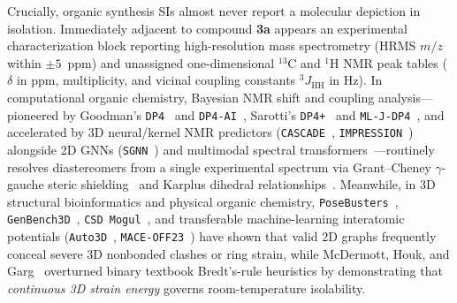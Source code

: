 \documentclass[10pt,twocolumn]{article}
\begin{document}
Crucially, organic synthesis SIs almost never report a molecular depiction in isolation. Immediately adjacent to compound \textbf{3a} appears an experimental characterization block reporting high-resolution mass spectrometry (HRMS $m/z$ within $\pm 5$~ppm) and unassigned one-dimensional $^{13}\text{C}$ and $^{1}\text{H}$ NMR peak tables ($\delta$ in ppm, multiplicity, and vicinal coupling constants $^3J_{\text{HH}}$ in Hz). In computational organic chemistry, Bayesian NMR shift and coupling analysis---pioneered by Goodman's \texttt{DP4}~\cite{Smith2010DP4} and \texttt{DP4-AI}~\cite{Howarth2020DP4AI}, Sarotti's \texttt{DP4+}~\cite{Grimblat2015DP4Plus} and \texttt{ML-J-DP4}~\cite{Tsai2022MLJDP4}, and accelerated by 3D neural/kernel NMR predictors (\texttt{CASCADE}~\cite{Guan2021CASCADE}, \texttt{IMPRESSION}~\cite{Gerrard2020IMPRESSION}) alongside 2D GNNs (\texttt{SGNN}~\cite{Jonas2019SGNN}) and multimodal spectral transformers~\cite{Kim2023DeepSAT,Alberts2024MultimodalSpectra,Bushuiev2024MassSpecGym,Bohde2025DiffMS}---routinely resolves diastereomers from a single experimental spectrum via Grant--Cheney $\gamma$-gauche steric shielding~\cite{GrantCheney1967} and Karplus dihedral relationships~\cite{Karplus1963}. Meanwhile, in 3D structural bioinformatics and physical organic chemistry, \texttt{PoseBusters}~\cite{Buttenschoen2024PoseBusters}, \texttt{GenBench3D}~\cite{Baillif2025GenBench3D}, \texttt{CSD Mogul}~\cite{Bruno2004Mogul}, and transferable machine-learning interatomic potentials (\texttt{Auto3D}~\cite{Liu2022Auto3D}, \texttt{MACE-OFF23}~\cite{Kovacs2025MACEOFF}) have shown that valid 2D graphs frequently conceal severe 3D nonbonded clashes or ring strain, while McDermott, Houk, and Garg~\cite{McDermott2024AntiBredt} overturned binary textbook Bredt's-rule heuristics by demonstrating that \emph{continuous 3D strain energy} governs room-temperature isolability.
\end{document}
